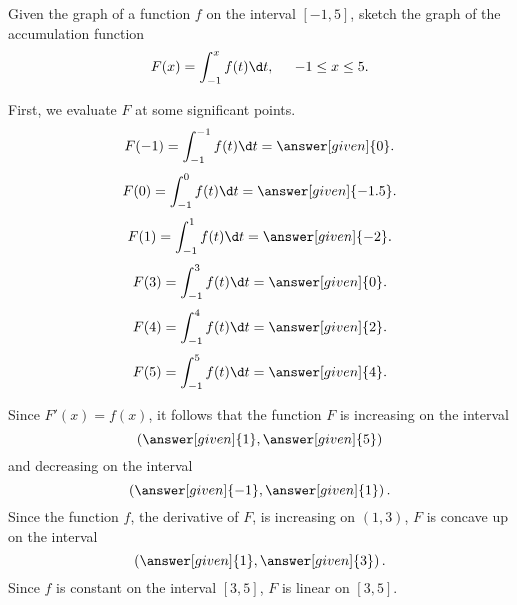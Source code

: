 \documentclass{ximera}
\begin{document}
\begin {example}
Given the graph of a function $f$ on the interval $[-1,5]$, sketch the graph of the accumulation function 
 \[
F(x) = \int_{-1}^x f(t) \d t, \hspace{0.2in}   -1\le x\le 5.
\]
\begin{image}
\end{image}
\begin{explanation}
First, we evaluate $F$ at some significant points.
\[
F(-1) = \int_{-1}^{-1} f(t) \d t=\answer[given]{0}.
\]
\[
F(0) = \int_{-1}^{0} f(t) \d t=\answer[given]{-1.5}.
\]
\[
F(1) = \int_{-1}^{1} f(t) \d t=\answer[given]{-2}.
\]
\[
F(3) = \int_{-1}^{3} f(t) \d t=\answer[given]{0}.
\]
\[
F(4) = \int_{-1}^{4} f(t) \d t=\answer[given]{2}.
\]
\[
F(5) = \int_{-1}^{5} f(t) \d t=\answer[given]{4}.
\]

Since $F'(x)=f(x)$, it follows that the function $F$ is increasing on the interval
\[
\left(\answer[given]{1},\answer[given]{5}\right)
\]
and decreasing on the interval
\[
\left(\answer[given]{-1},\answer[given]{1}\right).
\]
Since the function $f$, the derivative of $F$, is increasing on $(1,3)$,  $F$ is concave up on the interval
\[
\left(\answer[given]{1},\answer[given]{3}\right).
\]
Since $f$ is constant on the interval  $[3,5]$, $F$ is linear on $[3,5]$. 


\end{explanation}
\end{example}
\end{document}
